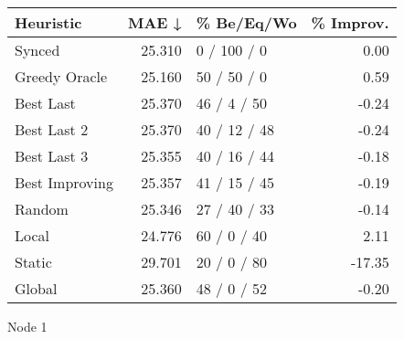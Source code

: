 \begin{tabular}{lrlr}
\toprule
\textbf{Heuristic} & \textbf{MAE ↓} & \textbf{\% Be/Eq/Wo} & \textbf{\% Improv.} \\
\midrule
            Synced &         25.310 &          0 / 100 / 0 &                0.00 \\
     Greedy Oracle &         25.160 &          50 / 50 / 0 &                0.59 \\
         Best Last &         25.370 &          46 / 4 / 50 &               -0.24 \\
       Best Last 2 &         25.370 &         40 / 12 / 48 &               -0.24 \\
       Best Last 3 &         25.355 &         40 / 16 / 44 &               -0.18 \\
    Best Improving &         25.357 &         41 / 15 / 45 &               -0.19 \\
            Random &         25.346 &         27 / 40 / 33 &               -0.14 \\
             Local &         24.776 &          60 / 0 / 40 &                2.11 \\
            Static &         29.701 &          20 / 0 / 80 &              -17.35 \\
            Global &         25.360 &          48 / 0 / 52 &               -0.20 \\
\bottomrule
\end{tabular}
\caption{Node 1}
\label{tab:iid_lr01_le1_bs2_1}
